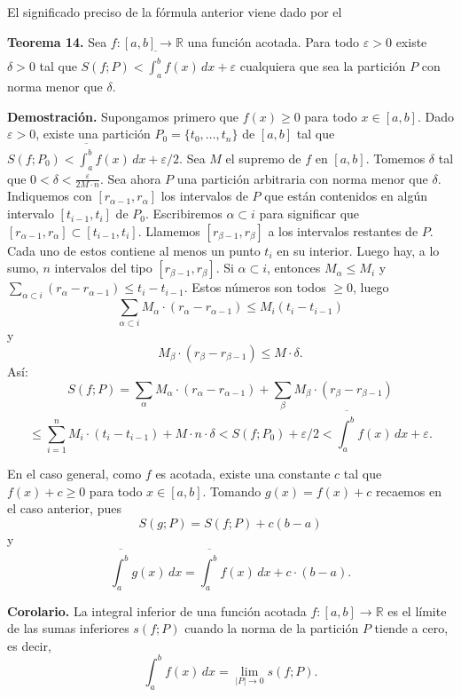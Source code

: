 \documentclass[12pt,oneside]{book}
\begin{document}
El significado preciso de la fórmula anterior viene dado por el

\textbf{Teorema 14.} Sea \(f: [a, b] \to \mathbb{R}\) una función acotada. Para todo \(\varepsilon > 0\) existe \(\delta > 0\) tal que \(S(f; P) < \overline{\int_a^b} f(x) \, dx + \varepsilon\) cualquiera que sea la partición \(P\) con norma menor que \(\delta\).

\textbf{Demostración.} Supongamos primero que \(f(x) \geq 0\) para todo \(x \in [a, b]\). Dado \(\varepsilon > 0\), existe una partición \(P_0 = \{t_0, \dots, t_n\}\) de \([a, b]\) tal que \(S(f; P_0) < \overline{\int_a^b} f(x) \, dx + \varepsilon/2\). Sea \(M\) el supremo de \(f\) en \([a, b]\). Tomemos \(\delta\) tal que \(0 < \delta < \frac{\varepsilon}{2M \cdot n}\). Sea ahora \(P\) una partición arbitraria con norma menor que \(\delta\). Indiquemos con \([r_{\alpha-1}, r_\alpha]\) los intervalos de \(P\) que están contenidos en algún intervalo \([t_{i-1}, t_i]\) de \(P_0\). Escribiremos \(\alpha \subset i\) para significar que \([r_{\alpha-1}, r_\alpha] \subset [t_{i-1}, t_i]\). Llamemos \([r_{\beta-1}, r_\beta]\) a los intervalos restantes de \(P\). Cada uno de estos contiene al menos un punto \(t_i\) en su interior. Luego hay, a lo sumo, \(n\) intervalos del tipo \([r_{\beta-1}, r_\beta]\). Si \(\alpha \subset i\), entonces \(M_\alpha \leq M_i\) y \(\sum_{\alpha \subset i} (r_\alpha - r_{\alpha-1}) \leq t_i - t_{i-1}\). Estos números son todos \(\geq 0\), luego
\[
\sum_{\alpha \subset i} M_\alpha \cdot (r_\alpha - r_{\alpha-1}) \leq M_i (t_i - t_{i-1})
\]
y
\[
M_\beta \cdot (r_\beta - r_{\beta-1}) \leq M \cdot \delta.
\]
Así:
\[
S(f; P) = \sum_{\alpha} M_\alpha \cdot (r_\alpha - r_{\alpha-1}) + \sum_{\beta} M_\beta \cdot (r_\beta - r_{\beta-1})
\]
\[
\leq \sum_{i=1}^n M_i \cdot (t_i - t_{i-1}) + M \cdot n \cdot \delta
< S(f; P_0) + \varepsilon/2 < \overline{\int_a^b} f(x) \, dx + \varepsilon.
\]

En el caso general, como \(f\) es acotada, existe una constante \(c\) tal que \(f(x) + c \geq 0\) para todo \(x \in [a, b]\). Tomando \(g(x) = f(x) + c\) recaemos en el caso anterior, pues
\[
S(g; P) = S(f; P) + c(b - a)
\]
y
\[
\overline{\int_a^b} g(x) \, dx = \overline{\int_a^b} f(x) \, dx + c \cdot (b - a).
\]

\textbf{Corolario.} La integral inferior de una función acotada \(f: [a, b] \to \mathbb{R}\) es el límite de las sumas inferiores \(s(f; P)\) cuando la norma de la partición \(P\) tiende a cero, es decir,
\[
\int_a^b f(x) \, dx = \lim_{|P| \to 0} s(f; P).
\]
\end{document}
